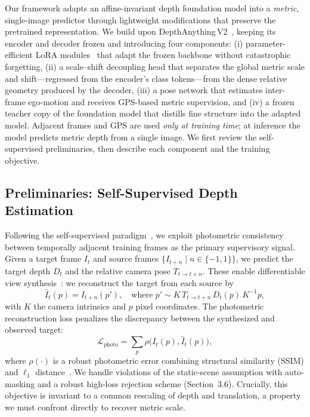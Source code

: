 Our framework adapts an affine-invariant depth foundation model into a \emph{metric}, single-image predictor through lightweight modifications that preserve the pretrained representation. We build upon DepthAnything\,V2~\cite{yang2024depth}, keeping its encoder and decoder frozen and introducing four components: (i) parameter-efficient LoRA modules~\cite{hu2022lora} that adapt the frozen backbone without catastrophic forgetting, (ii) a scale--shift decoupling head that separates the global metric scale and shift---regressed from the encoder's class tokens---from the dense relative geometry produced by the decoder, (iii) a pose network that estimates inter-frame ego-motion and receives GPS-based metric supervision, and (iv) a frozen teacher copy of the foundation model that distills fine structure into the adapted model. Adjacent frames and GPS are used \emph{only at training time}; at inference the model predicts metric depth from a single image. We first review the self-supervised preliminaries, then describe each component and the training objective.

\subsection{Preliminaries: Self-Supervised Depth Estimation}

Following the self-supervised paradigm~\cite{zhou2017unsupervised, godard2019digging}, we exploit photometric consistency between temporally adjacent training frames as the primary supervisory signal. Given a target frame \(I_{t}\) and source frames \(\{I_{t+n}\mid n \in \{-1, 1\}\}\), we predict the target depth \(D_t\) and the relative camera pose \(T_{t \to t+n}\). These enable differentiable view synthesis~\cite{garg2016unsupervised}: we reconstruct the target from each source by
\begin{equation}
  \hat{I}_{t}(p) = I_{t+n}(p'), \quad \text{where } p' \sim K\, T_{t \to t+n}\, D_t(p)\, K^{-1} p,
\end{equation}
with \(K\) the camera intrinsics and \(p\) pixel coordinates. The photometric reconstruction loss penalizes the discrepancy between the synthesized and observed target:
\begin{equation}
    \mathcal{L}_{\text{photo}} = \sum_{p} \rho\big(I_t(p), \hat{I}_{t}(p)\big),
\end{equation}
where \(\rho(\cdot)\) is a robust photometric error combining structural similarity (SSIM) and \(\ell_1\) distance~\cite{godard2019digging}. We handle violations of the static-scene assumption with auto-masking and a robust high-loss rejection scheme (Section~3.6). Crucially, this objective is invariant to a common rescaling of depth and translation, a property we must confront directly to recover metric scale.

